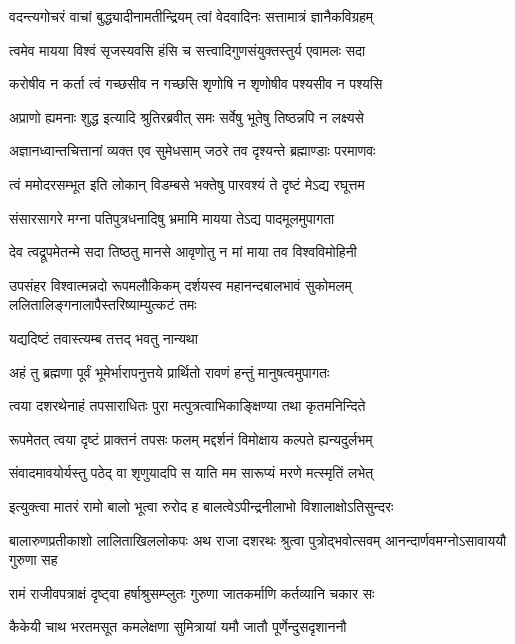 \twolineshloka
{वदन्त्यगोचरं वाचां बुद्ध्यादीनामतीन्द्रियम्}
{त्वां वेदवादिनः सत्तामात्रं ज्ञानैकविग्रहम्} %

\twolineshloka
{त्वमेव मायया विश्वं सृजस्यवसि हंसि च}
{सत्त्वादिगुणसंयुक्तस्तुर्य एवामलः सदा} %

\twolineshloka
{करोषीव न कर्ता त्वं गच्छसीव न गच्छसि}
{शृणोषि न शृणोषीव पश्यसीव न पश्यसि} %

\twolineshloka
{अप्राणो ह्यमनाः शुद्ध इत्यादि श्रुतिरब्रवीत्}
{समः सर्वेषु भूतेषु तिष्ठन्नपि न लक्ष्यसे} %

\twolineshloka
{अज्ञानध्वान्तचित्तानां व्यक्त एव सुमेधसाम्}
{जठरे तव दृश्यन्ते ब्रह्माण्डाः परमाणवः} %

\twolineshloka
{त्वं ममोदरसम्भूत इति लोकान् विडम्बसे}
{भक्तेषु पारवश्यं ते दृष्टं मेऽद्य रघूत्तम} %

\twolineshloka
{संसारसागरे मग्ना पतिपुत्रधनादिषु}
{भ्रमामि मायया तेऽद्य पादमूलमुपागता} %

\twolineshloka
{देव त्वद्रूपमेतन्मे सदा तिष्ठतु मानसे}
{आवृणोतु न मां माया तव विश्वविमोहिनी} %

\threelineshloka
{उपसंहर विश्वात्मन्नदो रूपमलौकिकम्}
{दर्शयस्व महानन्दबालभावं सुकोमलम्}
{ललितालिङ्गनालापैस्तरिष्याम्युत्कटं तमः} %


\onelineshloka
{यद्यदिष्टं तवास्त्यम्ब तत्तद् भवतु नान्यथा} %

\twolineshloka
{अहं तु ब्रह्मणा पूर्वं भूमेर्भारापनुत्तये}
{प्रार्थितो रावणं हन्तुं मानुषत्वमुपागतः} %

\twolineshloka
{त्वया दशरथेनाहं तपसाराधितः पुरा}
{मत्पुत्रत्वाभिकाङ्क्षिण्या तथा कृतमनिन्दिते} %

\twolineshloka
{रूपमेतत् त्वया दृष्टं प्राक्तनं तपसः फलम्}
{मद्दर्शनं विमोक्षाय कल्पते ह्यन्यदुर्लभम्} %

\twolineshloka
{संवादमावयोर्यस्तु पठेद् वा शृणुयादपि}
{स याति मम सारूप्यं मरणे मत्स्मृतिं लभेत्} %

\twolineshloka
{इत्युक्त्वा मातरं रामो बालो भूत्वा रुरोद ह}
{बालत्वेऽपीन्द्रनीलाभो विशालाक्षोऽतिसुन्दरः} %

\threelineshloka
{बालारुणप्रतीकाशो लालिताखिललोकपः}
{अथ राजा दशरथः श्रुत्वा पुत्रोद्भवोत्सवम्}
{आनन्दार्णवमग्नोऽसावाययौ गुरुणा सह} %

\twolineshloka
{रामं राजीवपत्राक्षं दृष्ट्वा हर्षाश्रुसम्प्लुतः}
{गुरुणा जातकर्माणि कर्तव्यानि चकार सः} %

\twolineshloka
{कैकेयी चाथ भरतमसूत कमलेक्षणा}
{सुमित्रायां यमौ जातौ पूर्णेन्दुसदृशाननौ} %

